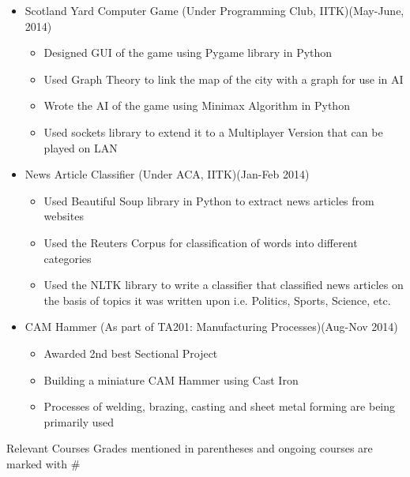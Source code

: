 \documentclass{article}
\begin{document}
\begin{itemize}
\item {\large Scotland Yard Computer Game}\newline
(Under Programming Club, IITK)\hfill (May-June, 2014)
	\begin{itemize}
	\item Designed GUI of the game using Pygame library in Python
	\item Used Graph Theory to link the map of the city with a graph for use in AI
	\item Wrote the AI of the game using Minimax Algorithm in Python

	\item Used sockets library to extend it to a Multiplayer Version that can be played on LAN
	\end{itemize}
	
\item {\large News Article Classifier}\newline
(Under ACA, IITK)\hfill (Jan-Feb 2014)
	\begin{itemize}
	\item Used Beautiful Soup library in Python to extract news articles from websites
	\item Used the Reuters Corpus for classification of words into different categories
	\item Used the NLTK library to write a classifier that classified news articles on the basis of topics it was written upon i.e. Politics, Sports, Science, etc.
	\end{itemize}
	
\item {\large CAM Hammer}\newline	
(As part of TA201: Manufacturing Processes)\hfill (Aug-Nov 2014)
	\begin{itemize}
	\item Awarded 2nd best Sectional Project
	\item Building a miniature CAM Hammer using Cast Iron
	\item Processes of welding, brazing, casting and sheet metal forming are being primarily used
	\end{itemize}
	\end{itemize}
\vspace{10pt}	
{\Large Relevant Courses}
\newline
Grades mentioned in parentheses and ongoing courses are marked with \#
\newline
\newline
\end{document}
